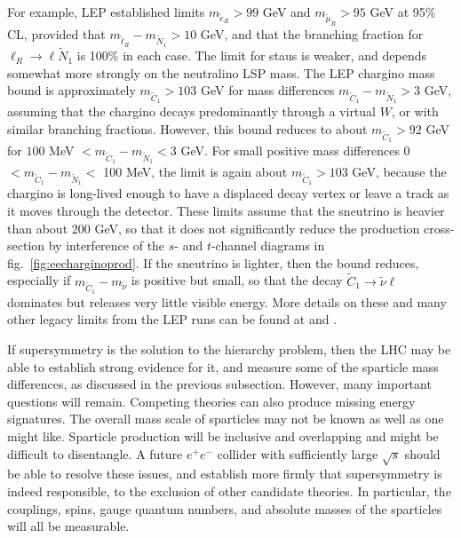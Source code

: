 \documentclass[11pt]{article}
\def\stilde{\widetilde}
\begin{document}
For example, LEP established limits $m_{\tilde e_R} > 99$ GeV and 
$m_{\tilde \mu_R} > 95$ GeV at 95\% CL, provided that $m_{\tilde \ell_R} - 
m_{\tilde N_1} > 10$ GeV, and that the branching fraction for $\ell_R 
\rightarrow \ell \stilde N_1$ is 100\% in each case. The limit for staus 
is weaker, and depends somewhat more strongly on the neutralino LSP mass.
The LEP chargino mass bound is approximately $m_{\tilde C_1} > 103$ GeV 
for mass differences $m_{\tilde C_1} - m_{\tilde N_1} > 3$ GeV, assuming 
that the chargino decays predominantly through a virtual $W$, or with 
similar branching fractions. However, this bound reduces to about 
$m_{\tilde C_1} > 92$ GeV for $100$ MeV $< m_{\tilde C_1} - m_{\tilde N_1} 
< 3$ GeV. For small positive mass differences 0 $< m_{\tilde C_1} - 
m_{\tilde N_1} <$ 100 MeV, the limit is again about $m_{\tilde C_1} > 103$ 
GeV, because the chargino is long-lived enough to have a displaced decay 
vertex or leave a track as it moves through the detector. These limits 
assume that the sneutrino is heavier than about 200 GeV, so that it does 
not significantly reduce the production cross-section by interference of 
the $s$- and $t$-channel diagrams in fig.~\ref{fig:eecharginoprod}. If the 
sneutrino is lighter, then the bound reduces, especially if $m_{\tilde C_1} - 
m_{\tilde \nu}$ is positive but small, so that the decay $\stilde C_1 
\rightarrow \tilde \nu \ell$ dominates but releases very little visible 
energy. More details on these and many other legacy limits from the LEP runs can 
be found at \cite{LEPSUSYWG} and \cite{RPP}.

If supersymmetry is the solution to the hierarchy problem, then the LHC 
may be able to establish strong evidence for it, and measure 
some of the sparticle mass differences, as discussed in the previous 
subsection. However, many important questions will remain. 
Competing theories can also produce missing energy signatures. The overall 
mass scale of sparticles may not be known as well as one might like. 
Sparticle production will be inclusive and overlapping and might be 
difficult to disentangle. A future $e^+e^-$ collider 
with sufficiently large $\sqrt{s}$
should be able to resolve these issues, and establish more firmly that 
supersymmetry is indeed responsible, to the exclusion of other 
candidate theories. In 
particular, the couplings, spins, gauge quantum numbers, and absolute 
masses of the sparticles will all be measurable.
\end{document}

